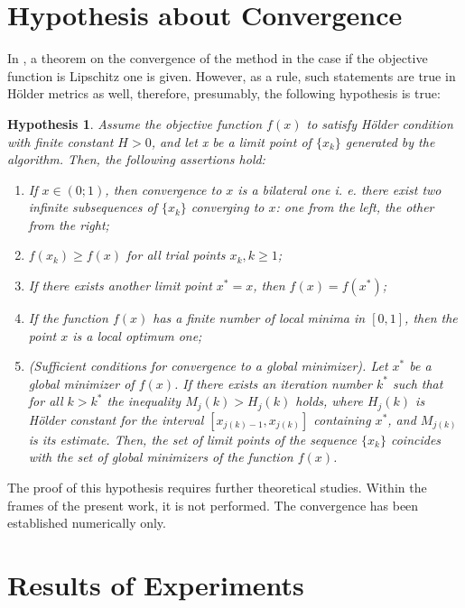 \documentclass[procedia]{easychair}
\newtheorem{hypothesis}{Hypothesis}
\begin{document}
\section{Hypothesis about Convergence}
In \cite{sergLocalTuning}, a theorem on the convergence of the method in the case if the objective
function is Lipschitz one is given. However, as a rule, such statements are true in
Hölder metrics as well, therefore, presumably, the following hypothesis is true:

\begin{hypothesis}
Assume the objective function \(f(x)\) to  satisfy Hölder condition with finite
constant \(H > 0\), and let x be a limit point of \(\{x_k\}\) generated by the algorithm.
Then, the following assertions hold:
\begin{enumerate}
  \item If \(x\in(0;1)\), then convergence to \(x\) is a bilateral one i. e. there
  exist two infinite subsequences of \(\{x_k\}\) converging to \(x\): one from the
  left, the other from the right;
  \item \(f(x_k) \geqslant f(x)\) for all trial points \(x_k, k \geqslant 1\);
  \item If there exists another limit point \(x^* = x\), then \(f(x) = f(x^*)\);
  \item If the function \(f(x)\) has a finite number of local minima in \([0, 1]\),
  then the point \(x\) is a local optimum one;
  \item (Sufficient conditions for convergence to a global minimizer). Let \(x^*\)
  be a global minimizer of \(f(x)\). If there exists an iteration number \(k^*\)
  such that for all \(k > k^*\) the inequality
  \(M_j(k) > H_j(k)\) holds, where \(H_j(k)\) is Hölder constant for the interval
  \([x_{j(k)-1}, x_{j(k)}]\) containing \(x^*\), and \(M_{j(k)}\) is its estimate.
  Then, the set of limit points of the sequence \(\{x_k\}\) coincides with the set
  of global minimizers of the function \(f(x)\).
\end{enumerate}
\end{hypothesis}

The proof of this hypothesis requires further theoretical studies. Within the frames of
the present work, it is not performed. The convergence has been established numerically only.

\section{Results of Experiments}
\label{sect:experiments}
\end{document}
